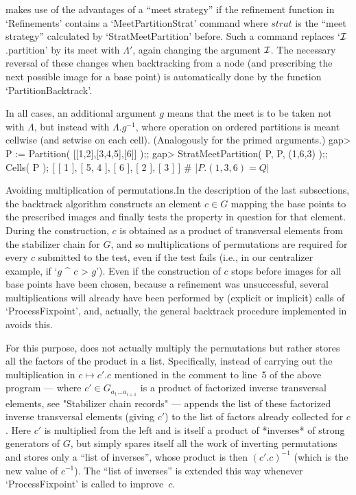 {\GAP} makes use   of  the advantages  of   a ``meet  strategy''  if  the
refinement   function  in `Refinements'  contains  a `MeetPartitionStrat'
command where   $strat$  is   the    ``meet  strategy''  calculated    by
`StratMeetPartition' before.  Such a command replaces `${\cal I}$.partition' by
its meet with $\Lambda'$, again changing the argument ${\cal I}$. The necessary
reversal of these changes when backtracking from  a node (and prescribing
the next possible image  for a base point) is  automatically done by  the
function `PartitionBacktrack'.

In  all cases, an additional  argument $g$ means that the   meet is to be
taken  not with $\Lambda$,   but  instead with $\Lambda.{g^{-1}}$,  where
operation  on ordered partitions is  meant cellwise  (and setwise on each
cell). (Analogously for the primed arguments.)
\beginexample
    gap> P := Partition( [[1,2],[3,4,5],[6]] );;
    gap> StratMeetPartition( P, P, (1,6,3) );;  Cells( P );
    [ [ 1 ], [ 5, 4 ], [ 6 ], [ 2 ], [ 3 ] ]  # |$P.(1,3,6) = Q|$
\endexample

\medskip
{\bsf Avoiding multiplication  of permutations.}\quad In the  description
of  the last subsections, the  backtrack  algorithm constructs an element
$c\in G$ mapping  the base points   to the prescribed images  and finally
tests the property in question for that element. During the construction,
$c$ is obtained as a product  of transversal elements from the stabilizer
chain for $G$,  and so multiplications  of permutations are required  for
every $c$  submitted to the test,  even if the  test fails (i.e.,  in our
centralizer example, if `$g$ ^ $c$ \<> $g$'). Even if the construction of
$c$ stops before images  for all base  points have been chosen, because a
refinement was unsuccessful,  several  multiplications will  already have
been performed by (explicit or implicit) calls of `ProcessFixpoint', and,
actually, the general   backtrack procedure implemented in  {\GAP} avoids
this.

For this purpose, {\GAP} does  not actually multiply the permutations but
rather stores  all the factors of the   product in a  list. Specifically,
instead of carrying out  the multiplication in $c\mapsto c'.c$  mentioned
in  the   comment  to  line~5 of  the   above  program   --- where $c'\in
G_{a_1\ldots  a_{i+1}}$ is a  product  of factorized inverse  transversal
elements, see "Stabilizer  chain records" ---  {\GAP} appends the list of
these factorized inverse  transversal elements (giving  $c'$) to the list
of factors already  collected for $c$. Here $c'$  is multiplied from  the
left and is itself a  product of *inverses*  of strong generators of $G$,
but {\GAP} simply spares itself   all the work of inverting  permutations
and stores  only  a    ``list  of  inverses'',  whose product    is  then
$(c'.c)^{-1}$  (which is  the  new  value of  $c^{-1}$).  The ``list   of
inverses'' is  extended this way  whenever `ProcessFixpoint' is called to
improve~$c$.

